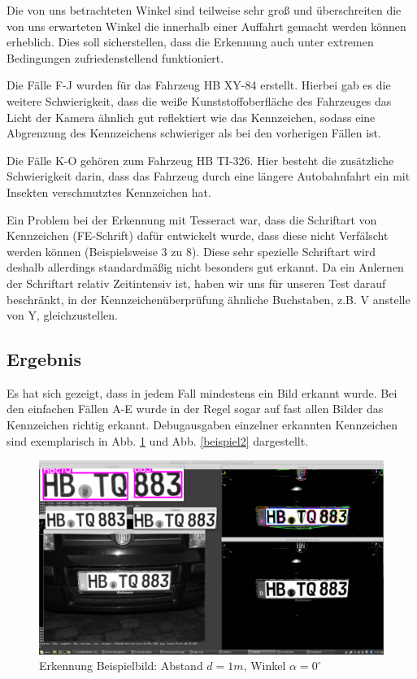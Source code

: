 \documentclass{../Vorlage/sebDenCls}
\begin{document}
Die von uns betrachteten Winkel sind teilweise sehr groß und überschreiten die von uns erwarteten Winkel die innerhalb einer Auffahrt gemacht werden können erheblich. Dies soll sicherstellen, dass die Erkennung auch unter extremen Bedingungen zufriedenstellend funktioniert.

Die Fälle F-J wurden für das Fahrzeug HB XY-84 erstellt. Hierbei gab es die weitere Schwierigkeit, dass die weiße Kunststoffoberfläche des Fahrzeuges das Licht der Kamera ähnlich gut reflektiert wie das Kennzeichen, sodass eine Abgrenzung des Kennzeichens schwieriger als bei den vorherigen Fällen ist.

Die Fälle K-O gehören zum Fahrzeug HB TI-326. Hier besteht die zusätzliche Schwierigkeit darin, dass das Fahrzeug durch eine längere Autobahnfahrt ein mit Insekten verschmutztes Kennzeichen hat.

Ein Problem bei der Erkennung mit Tesseract war, dass die Schriftart von Kennzeichen (FE-Schrift)  dafür entwickelt wurde, dass diese nicht Verfälscht werden können (Beispielsweise 3 zu 8). Diese sehr spezielle Schriftart wird deshalb allerdings standardmäßig nicht besonders gut erkannt. Da ein Anlernen der Schriftart relativ Zeitintensiv ist, haben wir uns für unseren Test darauf beschränkt, in der Kennzeichenüberprüfung ähnliche Buchstaben, z.B. V anstelle von Y, gleichzustellen.

\subsection{Ergebnis}
Es hat sich gezeigt, dass in jedem Fall mindestens ein Bild erkannt wurde. Bei den einfachen Fällen A-E wurde in der Regel sogar auf fast allen Bilder das Kennzeichen richtig erkannt.
Debugausgaben einzelner erkannten Kennzeichen sind exemplarisch in Abb. \ref{beispiel} und Abb. \ref{beispiel2} dargestellt.

\begin{figure}[htp]
	\centering 	
	\includegraphics[width=.9\textwidth]{Funktioniert_1962.png} 
	\caption{Erkennung Beispielbild: Abstand $d=1m$, Winkel $\alpha = 0^\circ$ \label{beispiel}}
\end{figure}
\end{document}
